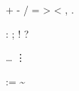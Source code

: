 
 {+} %
 {-} %
 {\cdot} %
 {/} %
 {=} %
 {>} %
 {<} %
 {,} %
 {.} %


 {:} %
 {;} %
 {!} %
 {?} %

 {\cdots}
 {\ldots}
 {\vdots}
 {\ddots}

 {\geq}
 {\leq}
 {:=} %
 {\sim}
 {\approx}
 {\mid} %


 {}
 {\partial}
 {}
 {}
 {}
 {\intercal}


 {\alpha}
 {\beta}
 {\Gamma}
 {\gamma}
 {\Delta}
 {\delta}
 {\varepsilon}
 {\zeta}
 {\eta}
 {\Theta}
 {\vartheta}
 {\iota}
 {\kappa}
 {\Lambda}
 {\lambda}
 {\mu}
 {\nu}
 {\iota}
 {\Pi}
 {\pi}
 {\rho}
 {\Sigma}
 {\sigma}
 {\tau}
 {\Upsilon}
 {\upsilon}
 {\Phi}
 {\varphi}
 {\Chi}
 {\chi}
 {\Psi}
 {\psi}
 {\Omega}
 {\omega}

 {\hspace [small]}
 {\hspace [medium]}
 {\hspace [big]}
 {\hspace [big] \hspace [medium]}
 {\hspace [big] \hspace [big]}

